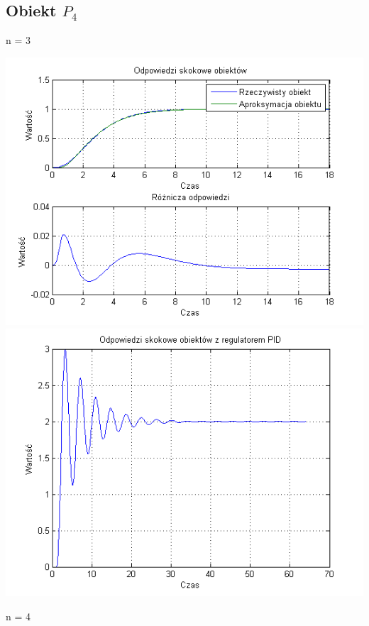 \documentclass[10pt,a4paper]{article}
\begin{document}
\subsection{Obiekt $P_4$}
n = 3
\begin{center}
\includegraphics[scale=1]{images/dwa/skrypt_105.png}\\
\includegraphics[scale=1]{images/dwa/skrypt_106.png}\\
\end{center}
\newpage
n = 4
\end{document}
